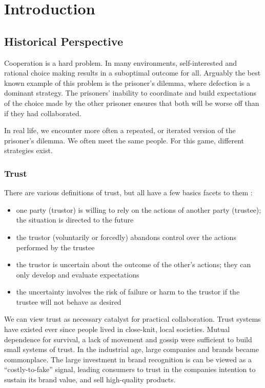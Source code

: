 \chapter{Introduction}
\section{Historical Perspective}
Cooperation is a hard problem. 
In many environments, self-interested and rational choice making results in a suboptimal outcome for all. 
Arguably the best known example of this problem is the prisoner's dilemma, 
where defection is a dominant strategy. 
The prisoners' inability to coordinate and build expectations of the choice made by the other prisoner ensures that both will be worse off than if they had collaborated.

In real life, we encounter more often a repeated, or iterated version of the prisoner's dilemma.
We often meet the same people. 
For this game, different strategies exist. 

\subsection{Trust}
There are various definitions of trust, 
but all have a few basics facets to them \cite{wikipedia_trust}:
\begin{itemize}
	\item one party (trustor) is willing to rely on the actions of another party (trustee); 
	the situation is directed to the future
	\item the trustor (voluntarily or forcedly) abandons control over the actions performed by the trustee
	\item the trustor is uncertain about the outcome of the other's actions; 
	they can only develop and evaluate expectations
	\item the uncertainty involves the risk of failure or harm to the trustor if the trustee will not behave as desired
\end{itemize}
We can view trust as necessary catalyst for practical collaboration.
Trust systems have existed ever since people lived in close-knit, local societies. Mutual dependence for survival, a lack of movement and gossip were sufficient to build small systems of trust.
In the industrial age, large companies and brands became commonplace.
The large investment in brand recognition is can be viewed as a ``costly-to-fake'' signal, leading consumers to trust in the companies intention to sustain its brand value, and sell high-quality products.

